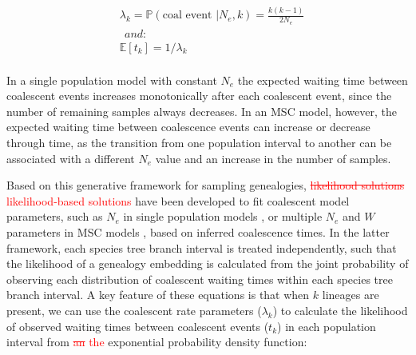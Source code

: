\documentclass[11pt]{article}
\begin{document}
\begin{equation}
\begin{aligned}
	&\lambda_k = \mathbb{P}(\text{coal~event~} | N_e,k) = \frac{k(k-1)}{2N_e}
	\\
	&~~and:
	\\[0.15cm]
	&\mathbb{E}[t_k] = 1 / \lambda_k
	\\[0.15cm]	
\end{aligned}
\end{equation}

\noindent In a single population model
with constant $N_e$ the expected waiting time between coalescent events 
increases monotonically after each coalescent event, since the number of
remaining samples always decreases. In an MSC model, 
however, the expected waiting time between coalescence events can increase or 
decrease through time, as the transition from one population interval to another 
can be associated with a different $N_e$ value and an increase in the number 
of samples.

Based on this generative framework for sampling genealogies, 
\textcolor{red}{
\sout{likelihood solutions}
likelihood-based solutions
} 
have been developed to fit coalescent model parameters, such as 
$N_e$ in single population models \citep{kingman1982coalescent},
or multiple $N_e$ and $W$ parameters in MSC models \citep{rannala2003bayes}, 
based on inferred coalescence times. 
In the latter framework, each species tree branch interval is treated independently, 
such that the likelihood of a genealogy embedding is calculated from the joint
probability of observing each distribution of coalescent waiting times within
each species tree branch interval. A key feature of these equations is that 
when $k$ lineages are present, we can use the coalescent rate parameters 
($\lambda_k$)
to calculate the likelihood of observed waiting times between coalescent 
events ($t_k$) in each population interval from 
\textcolor{red}{\sout{an} the}
exponential probability density function:
	
\end{document}

